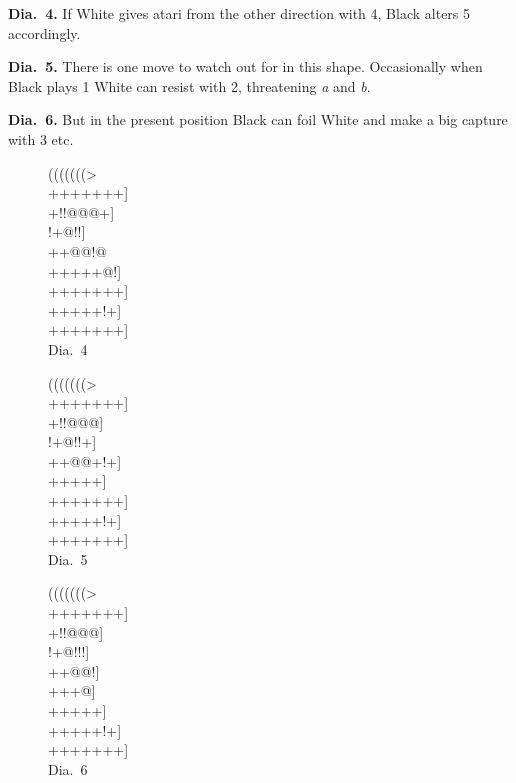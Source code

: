 \documentclass[mcrownvopaper,10pt,twopage,onecolumn,final]{memoir}
\begin{document}
\noindent
\textbf{Dia.\ 4.} If White gives atari from the other direction with 4, Black alters
5 accordingly.

\noindent
\textbf{Dia.\ 5.} There is one move to watch out for in this shape. Occasionally
when Black plays 1 White can resist with 2, threatening \textit{a} and \textit{b}.

\noindent
\textbf{Dia.\ 6.} But in the present position Black can foil White and make a big
capture with 3 etc.

\begin{figure}[ht]
    \begin{minipage}[c]{0.33\linewidth}
        \centering    
        {\gnos%
        (((((((>\\
        +++++++]\\
        +!!@@@+]\\
        !+@!!{\gnosb{}}{\gnosw{}}]\\
        ++@@{\gnosb{}}!@{\gnosw{}}\\
        +++++@!]\\
        +++++++]\\
        +++++!+]\\
        +++++++]\\
        }
        Dia.\ 4
    \end{minipage}%
    \begin{minipage}[c]{0.33\linewidth}
        \centering    
        {\gnos%
        (((((((>\\
        +++++++]\\
        +!!@@@]\\
        !+@!!+{\gnosw{}}]\\
        ++@@+!+]\\
        +++++{\gnosb{}}]\\
        +++++++]\\
        +++++!+]\\
        +++++++]\\
        }
        Dia.\ 5
    \end{minipage}%
    \begin{minipage}[c]{0.33\linewidth}
        \centering    
        {\gnos%
        (((((((>\\
        +++++++]\\
        +!!@@@{\gnosw{}}]\\
        !+@!!{\gnosb{}}!]\\
        ++@@{\gnosw{}}!{\gnosb{}}]\\
        +++{\gnosw{}}@{\gnosb{}}]\\
        ++{\gnosb{}}+{\gnosb{}}++]\\
        +++++!+]\\
        +++++++]\\
        }
        Dia.\ 6
    \end{minipage}%
\end{figure}
\end{document}
